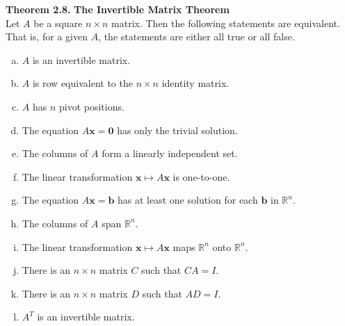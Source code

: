 \documentclass[10pt]{book}
\newcommand{\boxcolor}{gray!30}
\newenvironment{boxthm}{\begin{mdframed}[backgroundcolor=\boxcolor,nobreak=true]}{\end{mdframed}}
\theoremstyle{definition}
\newcommand{\R}{\mathbb{R}}
\newcommand{\vect}[1]{\ensuremath{\boldsymbol{\mathbf{#1}}}}
\newcommand{\Axb}{A\vect{x}=\vect{b}}
\newcommand{\Axz}{A\vect{x}=\vect{0}}
\newcommand{\Ax}{A\vect{x}}
\begin{document}
\begin{boxthm}
	\textbf{Theorem 2.8.}
	\textbf{The Invertible Matrix Theorem} \\
	Let $A$ be a square $n\times n$ matrix. Then the following statements are equivalent. That is, for a given $A$, the statements are either all true or all false.
	\begin{enumerate}[(a)]\itemsep0em 
		\item $A$ is an invertible matrix.
		\item $A$ is row equivalent to the $n\times n$ identity matrix.
		\item $A$ has $n$ pivot positions.
		\item The equation $\Axz$ has only the trivial solution.
		\item The columns of $A$ form a linearly independent set.
		\item The linear transformation $\vect{x}\mapsto\Ax$ is one-to-one.
		\item The equation $\Axb$ has at least one solution for each $\vect{b}$ in $\R^n$.
		\item The columns of $A$ span $\R^n$.
		\item The linear transformation $\vect{x}\mapsto\Ax$ maps $\R^n$ onto $\R^n$.
		\item There is an $n\times n$ matrix $C$ such that $CA=I$.
		\item There is an $n\times n$ matrix $D$ such that $AD=I$.
		\item $A^T$ is an invertible matrix.
	\end{enumerate}
\end{boxthm}
\end{document}
